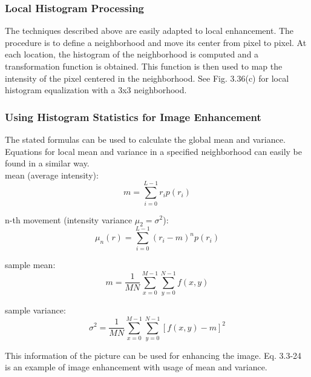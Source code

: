 \subsubsection{Local Histogram Processing }
The techniques described above are easily adapted to local enhancement. The procedure is to define a neighborhood and move its center from pixel to pixel.
At each location, the histogram of the neighborhood is computed and a transformation function is obtained. This function is then used to map the intensity of the pixel centered in the neighborhood.
See Fig. 3.36(c)  for local histogram equalization with a 3x3 neighborhood.

\newpage
\subsubsection{Using Histogram Statistics for Image Enhancement }
The stated formulas can be used to calculate the global mean and variance. Equations for local mean and variance in a specified neighborhood can easily be found in a similar way. \\

    mean (average intensity):
    \begin{equation}
        m = \sum\limits_{i=0}^{L-1}r_i p(r_i)
    \end{equation}
    
    n-th movement (intensity variance $\mu_2 = \sigma^2$):
    \begin{equation}
        \mu_n(r) = \sum\limits_{i=0}^{L-1}(r_i -m)^n p(r_i)
    \end{equation}
    
    sample mean:
	\begin{equation}
		m = \frac{1}{MN} \sum\limits_{x=0}^{M-1} \sum\limits_{y=0}^{N-1} f(x,y)
	\end{equation}
	
	sample variance:
	\begin{equation}
		\sigma^2 =  \frac{1}{MN} \sum\limits_{x=0}^{M-1} \sum\limits_{y=0}^{N-1} \left[f(x,y)-m\right]^2
	\end{equation}

This information of the picture can be used for enhancing the image. Eq. 3.3-24  is an example of image enhancement with usage of mean and variance.  
